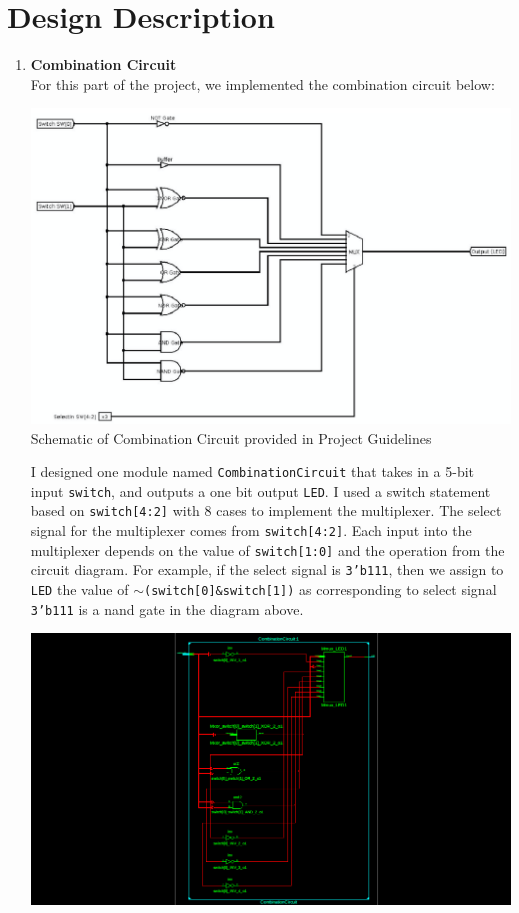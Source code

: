 \documentclass{article}
\begin{document}
\section{Design Description}
\renewcommand{\theenumi}{\alph{enumi}}
\begin{enumerate}
    \item \textbf{Combination Circuit} \\
    For this part of the project, we implemented the combination circuit below: \\
    \begin{center}
        \includegraphics[scale=0.3]{ComCircuitDiagram.png} \\
        \caption{Schematic of Combination Circuit provided in Project Guidelines}
    \end{center}
    I designed one module named \texttt{CombinationCircuit} that takes in a 5-bit input \texttt{switch}, and outputs a one bit output \texttt{LED}. I used a switch statement based on \texttt{switch[4:2]} with 8 cases to implement the multiplexer. The select signal for the multiplexer comes from \texttt{switch[4:2]}. Each input into the multiplexer depends on the value of \texttt{switch[1:0]} and the operation from the circuit diagram. For example, if the select signal is \texttt{3'b111}, then we assign to \texttt{LED} the value of \texttt{$\sim$(switch[0]&switch[1])} as corresponding to select signal \texttt{3'b111} is a nand gate in the diagram above.
    \begin{center}
        \includegraphics[scale=0.3]{combcircuitschema.png} \\

\end{center}
\end{enumerate}
\end{document}
